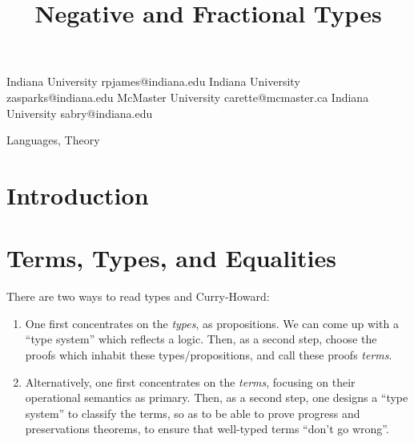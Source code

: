\documentclass[preprint]{sigplanconf}
\begin{document}
\CopyrightYear{}
\copyrightdata{}
\titlebanner{}
\preprintfooter{}

\title{Negative and Fractional Types} 

           {Indiana University}
           {rpjames@indiana.edu}
           {Indiana University}
           {zasparks@indiana.edu}
           {McMaster University}
           {carette@mcmaster.ca}
           {Indiana University}
           {sabry@indiana.edu}

\maketitle

\begin{abstract}

\end{abstract}


\terms
Languages, Theory

\keywords 

\section{Introduction}

\nocite{infeffects}

\section{Terms, Types, and Equalities}

There are two ways to read types and Curry-Howard: 
\begin{enumerate}
\item One first concentrates on the \emph{types}, as propositions.  We can
  come up with a ``type system'' which reflects a logic.  Then, as a second
  step, choose the proofs which inhabit these types/propositions, and call
  these proofs \emph{terms}.
\item Alternatively, one first concentrates on the \emph{terms}, focusing on
  their operational semantics as primary.  Then, as a second step, one
  designs a ``type system'' to classify the terms, so as to be able to prove
  progress and preservations theorems, to ensure that well-typed terms
  ``don't go wrong''.
\end{enumerate}
\end{document}
